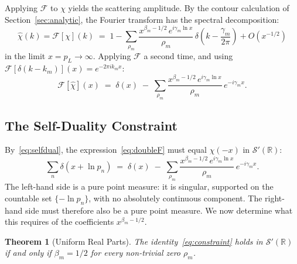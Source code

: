 \documentclass[11pt, oneside]{article}
\newtheorem{theorem}{Theorem}[section]
\theoremstyle{definition}
\begin{document}
Applying $\mathcal{F}$ to $\chi$ yields the scattering amplitude.
By the contour calculation of Section~\ref{sec:analytic}, the
Fourier transform has the spectral decomposition:
\begin{equation}
  \hat{\chi}(k) = \mathcal{F}[\chi](k)
  \;=\; 1 - \sum_{\rho_m}
        \frac{x^{\beta_m - 1/2}\,e^{i\gamma_m \ln x}}{\rho_m}
        \,\delta\!\left(k - \frac{\gamma_m}{2\pi}\right)
        + O(x^{-1/2})
  \label{eq:chihat}
\end{equation}
in the limit $x = p_L \to \infty$.
Applying $\mathcal{F}$ a second time, and using
$\mathcal{F}[\delta(k - k_m)](x) = e^{-2\pi i k_m x}$:
\begin{equation}
  \mathcal{F}[\hat{\chi}](x)
  \;=\; \delta(x)
        \;-\; \sum_{\rho_m}
              \frac{x^{\beta_m-1/2}\,e^{i\gamma_m \ln x}}{\rho_m}
              \,e^{-i\gamma_m x}.
  \label{eq:doubleF}
\end{equation}

\subsection{The Self-Duality Constraint}

By~\eqref{eq:selfdual}, the expression~\eqref{eq:doubleF} must
equal $\chi(-x)$ in $\mathcal{S}'(\mathbb{R})$:
\begin{equation}
  \sum_n \delta(x + \ln p_n)
  \;=\; \delta(x)
        \;-\; \sum_{\rho_m}
              \frac{x^{\beta_m - 1/2}\,e^{i\gamma_m\ln x}}{\rho_m}
              \,e^{-i\gamma_m x}.
  \label{eq:constraint}
\end{equation}
The left-hand side is a pure point measure: it is singular,
supported on the countable set $\{-\ln p_n\}$, with no absolutely
continuous component.
The right-hand side must therefore also be a pure point measure.
We now determine what this requires of the coefficients
$x^{\beta_m - 1/2}$.

\begin{theorem}[Uniform Real Parts]
\label{thm:uniform}
The identity~\eqref{eq:constraint} holds in
$\mathcal{S}'(\mathbb{R})$ if and only if $\beta_m = 1/2$
for every non-trivial zero $\rho_m$.
\end{theorem}
\end{document}
